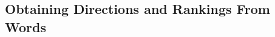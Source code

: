 


\subsection{Obtaining Directions and Rankings From Words}\label{ch3:LearningInterpretableDirections}

